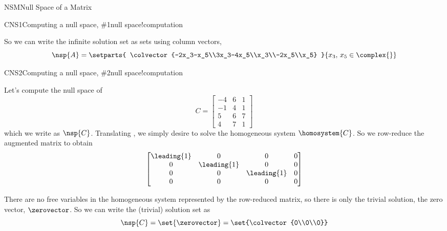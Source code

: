 \begin{subsect}{NSM}{Null Space of a Matrix}
\begin{example}{CNS1}{Computing a null space, \protect\#1}{null space!computation}
\begin{para}
\end{para}
%
\begin{para}So we can write the infinite solution set as sets using column vectors,
%
\begin{equation*}
\nsp{A}=\setparts{
\colvector{-2x_3-x_5\\3x_3-4x_5\\x_3\\-2x_5\\x_5}
}{
x_3,\,x_5\in\complex{\null}
}
\end{equation*}
\end{para}
%
\end{example}
%
\begin{example}{CNS2}{Computing a null space, \protect\#2}{null space!computation}
\begin{para}Let's compute the null space of
%
\begin{equation*}
C=\begin{bmatrix}
 -4 & 6 & 1 \\
 -1 & 4 & 1 \\
 5 & 6 & 7 \\
 4 & 7 & 1
\end{bmatrix}
\end{equation*}
%
which we write as $\nsp{C}$.   Translating , we simply desire to solve the homogeneous system $\homosystem{C}$.  So we row-reduce the augmented matrix to obtain
%
\begin{equation*}
\begin{bmatrix}
 \leading{1} & 0 & 0 & 0 \\
 0 & \leading{1} & 0 & 0 \\
 0 & 0 & \leading{1} & 0 \\
 0 & 0 & 0 & 0
\end{bmatrix}
\end{equation*}
\end{para}
%
\begin{para}There are no free variables in the homogeneous system represented by the row-reduced matrix, so there is only the trivial solution, the zero vector, $\zerovector$.  So we can write the (trivial) solution set as
%
\begin{equation*}
\nsp{C}=\set{\zerovector}=\set{\colvector{0\\0\\0}}
\end{equation*}\end{para}
%
\end{example}
%
%
%
\end{subsect}
%




